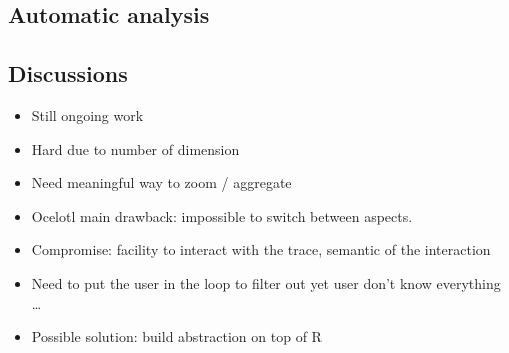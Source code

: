 \subsection{Automatic analysis}


\subsection{Discussions}

\begin{itemize}
    \item Still ongoing work
    \item Hard due to number of dimension
    \item Need meaningful way to zoom / aggregate
    \item Ocelotl main drawback: impossible to switch between aspects.
    \item Compromise: facility to interact with the trace, semantic of the interaction
    \item Need to put the user in the loop to filter out yet user don't know everything \ldots
    \item Possible solution: build abstraction on top of R
\end{itemize}

